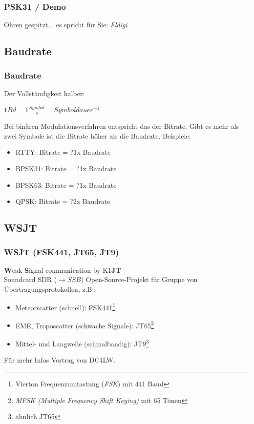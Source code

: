 \begin{frame}
    \frametitle{PSK31 / Demo}

    \Large{Ohren gespitzt... es spricht für Sie: \emph{Fldigi}}

\end{frame}

\subsection{Baudrate}

\begin{frame}
    \frametitle{Baudrate}

    Der Vollständigkeit halber: \\[2em]

    \begin{center}
        $1 Bd = 1 \frac{Symbol}{s} = Symboldauer^{-1}$
    \end{center}

    Bei binären Modulationsverfahren entspricht das der Bitrate. Gibt es mehr
    als zwei Symbole ist die Bitrate höher als die Baudrate. Beispiele:

    \begin{itemize}
        \item RTTY: Bitrate = ?1x Baudrate
        \item BPSK31: Bitrate = ?1x Baudrate
        \item BPSK63: Bitrate = ?1x Baudrate
        \item QPSK: Bitrate = ?2x Baudrate
    \end{itemize}

\end{frame}

\subsection{WSJT}

\begin{frame}
    \frametitle{WSJT (FSK441, JT65, JT9)}

    \textbf{W}eak \textbf{S}ignal communication by K1\textbf{JT} \\[2em]

    Soundcard SDR ($\rightarrow SSB$) Open-Source-Projekt für Gruppe von
    Übertragungsprotokollen, z.B.:

    \begin{itemize}
        \item Meteorscatter (schnell): FSK441\footnote{Vierton Frequenzumtastung
              (\emph{FSK}) mit 441 Baud}
        \item EME, Troposcatter (schwache Signale): JT65\footnote{\emph{MFSK
              (Multiple Frequency Shift Keying)} mit 65 Tönen}
        \item Mittel- und Langwelle (schmalbandig): JT9\footnote{ähnlich JT65}
    \end{itemize}

    \bigskip

    Für mehr Infos Vortrag von DC4LW\hyperlink{refs}{\cite{wsjt}}.

\end{frame}

